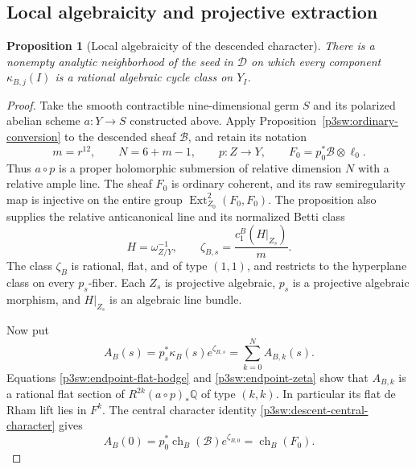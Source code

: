 \documentclass[11pt]{article}
\newcommand{\Q}{\mathbb Q}
\newtheorem{proposition}[theorem]{Proposition}
\numberwithin{equation}{section}
\begin{document}
\subsection{Local algebraicity and projective extraction}
\label{p3sw:endpoint-local-section}

\begin{proposition}[Local algebraicity of the descended character]
\label{p3sw:local-algebraicity}
There is a nonempty analytic neighborhood of the seed in
\(\mathscr D\) on which every component \(\kappa_{B,j}(I)\) is a
rational algebraic cycle class on \(Y_I\).
\end{proposition}

\begin{proof}
Take the smooth contractible nine-dimensional germ \(S\) and its
polarized abelian scheme \(a:Y\to S\) constructed above.
Apply Proposition~\ref{p3sw:ordinary-conversion} to the descended
sheaf \(\mathcal B\), and retain its notation
\[
 m=r^{12},\qquad N=6+m-1,\qquad p:Z\to Y,\qquad
 F_0=p_0^*\mathcal B\otimes\ell_0.
\]
Thus \(a\circ p\) is a proper holomorphic submersion of relative
dimension \(N\) with a relative ample line.  The sheaf \(F_0\) is
ordinary coherent, and its raw semiregularity map is injective on
the entire group \(\operatorname{Ext}^2_{Z_0}(F_0,F_0)\).
The proposition also supplies the relative anticanonical line and
its normalized Betti class
\begin{equation}
\label{p3sw:endpoint-zeta}
 H=\omega_{Z/Y}^{-1},\qquad
 \zeta_{B,s}=\frac{c_1^B(H|_{Z_s})}{m}.
\end{equation}
The class \(\zeta_B\) is rational, flat, and of type \((1,1)\),
and restricts to the hyperplane class on every \(p_s\)-fiber.
Each \(Z_s\) is projective algebraic, \(p_s\) is a projective
algebraic morphism, and \(H|_{Z_s}\) is an algebraic line bundle.

Now put
\begin{equation}
\label{p3sw:endpoint-horizontal-A}
 A_B(s)=p_s^*\kappa_B(s)e^{\zeta_{B,s}}
       =\sum_{k=0}^{N} A_{B,k}(s).
\end{equation}
Equations
\eqref{p3sw:endpoint-flat-hodge} and \eqref{p3sw:endpoint-zeta}
show that \(A_{B,k}\) is a rational flat section of
\(R^{2k}(a\circ p)_*\Q\) of type \((k,k)\).  In particular its
flat de Rham lift lies in \(F^k\).  The central character identity
\eqref{p3sw:descent-central-character} gives
\begin{equation}
\label{p3sw:endpoint-central-A}
 A_B(0)=p_0^*\operatorname{ch}_B(\mathcal B)e^{\zeta_{B,0}}
       =\operatorname{ch}_B(F_0).
\end{equation}


\end{proof}
\end{document}
